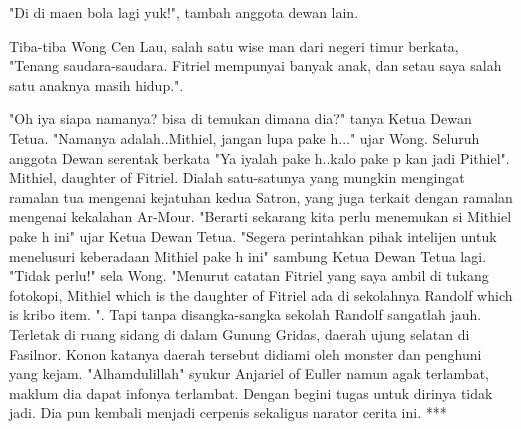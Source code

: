 \documentclass[a4paper,11pt,final]{article}
\begin{document}
"Di di maen bola lagi yuk!", tambah anggota dewan lain. 

Tiba-tiba Wong Cen Lau, salah satu wise man dari negeri timur berkata, 
"Tenang saudara-saudara. Fitriel mempunyai banyak anak, dan setau saya 
salah satu anaknya masih hidup.".

"Oh iya siapa namanya? bisa di temukan dimana dia?" tanya Ketua Dewan Tetua. "Namanya adalah..Mithiel, jangan lupa pake h..." ujar Wong. Seluruh anggota Dewan serentak berkata "Ya iyalah pake h..kalo pake p kan jadi Pithiel".
Mithiel, daughter of Fitriel. Dialah satu-satunya yang mungkin mengingat ramalan tua mengenai kejatuhan kedua Satron, yang juga terkait dengan ramalan mengenai kekalahan Ar-Mour.
"Berarti sekarang kita perlu menemukan si Mithiel pake h ini" ujar Ketua Dewan Tetua. "Segera perintahkan pihak intelijen untuk menelusuri keberadaan Mithiel pake h ini" sambung Ketua Dewan Tetua lagi.
"Tidak perlu!" sela Wong. "Menurut catatan Fitriel yang saya ambil di tukang fotokopi, Mithiel which is the daughter of Fitriel ada di sekolahnya Randolf which is kribo item. ".
Tapi tanpa disangka-sangka sekolah Randolf sangatlah jauh. Terletak di ruang sidang di dalam Gunung Gridas, daerah ujung selatan di Fasilnor. Konon katanya daerah tersebut didiami oleh monster dan penghuni yang kejam.
"Alhamdulillah" syukur Anjariel of Euller namun agak terlambat, maklum dia dapat infonya terlambat. Dengan begini tugas untuk dirinya tidak jadi. Dia pun kembali menjadi cerpenis sekaligus narator cerita ini.
***
\end{document}
